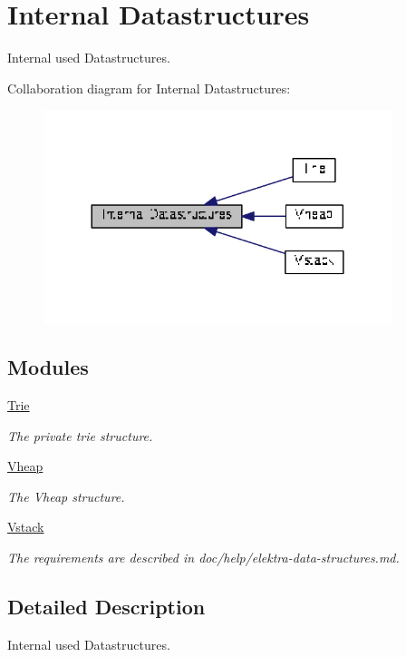 \hypertarget{group__internaldatastructs}{\section{Internal Datastructures}
\label{group__internaldatastructs}
}


Internal used Datastructures.  


Collaboration diagram for Internal Datastructures\+:
\nopagebreak
\begin{figure}[H]
\begin{center}
\leavevmode
\includegraphics[width=288pt]{group__internaldatastructs}
\end{center}
\end{figure}
\subsection*{Modules}
\begin{DoxyCompactItemize}
\item 
\hyperlink{group__trie}{Trie}
\begin{DoxyCompactList}\small\item\em The private trie structure. \end{DoxyCompactList}\item 
\hyperlink{group__vheap}{Vheap}
\begin{DoxyCompactList}\small\item\em The Vheap structure. \end{DoxyCompactList}\item 
\hyperlink{group__vstack}{Vstack}
\begin{DoxyCompactList}\small\item\em The requirements are described in doc/help/elektra-\/data-\/structures.\+md. \end{DoxyCompactList}\end{DoxyCompactItemize}


\subsection{Detailed Description}
Internal used Datastructures. 

